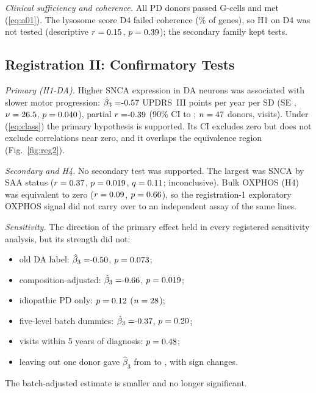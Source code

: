 \emph{Clinical sufficiency and coherence.} All \cctwoN{} PD donors passed G-cells and
\cctwoAzeroOne{} met (\ref{eq:a01}). The lysosome score D4 failed coherence
(\cctwoAfiveShare\% of \cctwoAfiveGenes{} genes), so H1 on D4 was not tested
(descriptive $r = 0.15$, $p = 0.39$); the secondary family kept \cctwoSecN{} tests.

\subsection{Registration II: Confirmatory Tests}\label{sec:res_reg2}
\emph{Primary (H1-DA).} Higher SNCA expression in DA neurons was associated with slower motor
progression: $\hat\beta_3 = \cctwoBeta$ UPDRS~III points per year per SD (SE \cctwoSE,
$\nu = 26.5$, $p = 0.040$), partial $r = \cctwoR$ (90\% CI \cctwoRlo{} to \cctwoRhi;
$n = 47$ donors, \cctwoVisits{} visits). Under (\ref{eq:class}) the primary hypothesis is
supported. Its CI excludes zero but does not exclude correlations near zero, and it overlaps the
equivalence region (Fig.~\ref{fig:reg2}).

\emph{Secondary and H4.} No secondary test was supported. The largest was SNCA by SAA status
($r = 0.37$, $p = 0.019$, $q = 0.11$; inconclusive). Bulk OXPHOS (H4) was
equivalent to zero ($r = 0.09$, $p = 0.66$), so the registration-1 exploratory OXPHOS
signal did not carry over to an independent assay of the same lines.

\emph{Sensitivity.} The direction of the primary effect held in every registered sensitivity
analysis, but its strength did not:
\begin{itemize}
\item old DA label: $\hat\beta_3 = \cctwoOldBeta$, $p = 0.073$;
\item composition-adjusted: $\hat\beta_3 = \cctwoAdjBeta$, $p = 0.019$;
\item idiopathic PD only: $p = 0.12$ ($n = 28$);
\item five-level batch dummies: $\hat\beta_3 = \cctwoBatchBeta$, $p = 0.20$;
\item visits within 5 years of diagnosis: $p = 0.48$;
\item leaving out one donor gave $\hat\beta_3$ from \cctwoLooMin{} to \cctwoLooMax, with
\cctwoLooSign{} sign changes.
\end{itemize}
The batch-adjusted estimate is smaller and no longer significant.

